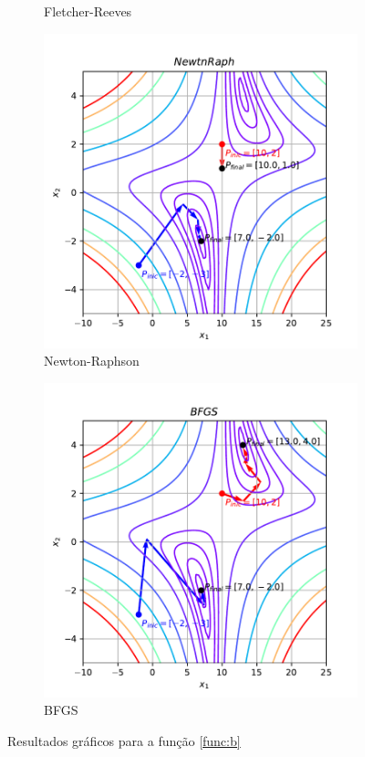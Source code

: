 \documentclass[10pt, a4paper]{article}
\begin{document}
\begin{figure}[htpb]
\begin{subfigure}[b]{0.32\textwidth}
    \caption{Fletcher-Reeves}
    \label{fig:q1b_fletchrvs}
  \end{subfigure}
  \hfill
  \begin{subfigure}[b]{0.32\textwidth}
    \centering
    \includegraphics[width=\textwidth]{images/q1b_NewtnRaph.pdf}
    \caption{Newton-Raphson}
    \label{fig:q1b_newtnraph}
  \end{subfigure}
  \hfill
  \begin{subfigure}[b]{0.32\textwidth}
    \centering
    \includegraphics[width=\textwidth]{images/q1b_BFGS.pdf}
    \caption{BFGS}
    \label{fig:q1b_bfgs}
  \end{subfigure}
     \caption{Resultados gráficos para a função \ref{func:b}}
     \label{fig:q1b}
\end{figure}
\end{document}
